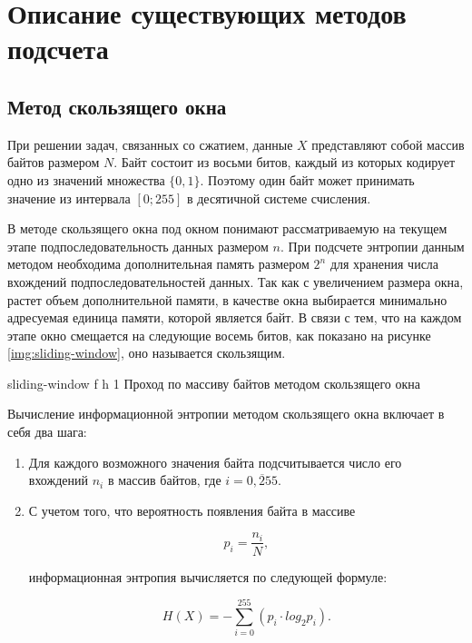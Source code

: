 \chapter{Описание существующих методов подсчета}

\section{Метод скользящего окна}

При решении задач, связанных со сжатием, данные $X$ представляют собой массив байтов размером $N$. Байт состоит из восьми битов, каждый из которых кодирует одно из значений множества $\{0, 1\}$. Поэтому один байт может принимать значение из интервала $[0; 255]$ в десятичной системе счисления. 

В методе скользящего окна \cite{sliding-window-method} под окном понимают рассматриваемую на текущем этапе подпоследовательность данных размером $n$. При подсчете энтропии данным методом необходима дополнительная память размером $2^n$ для хранения числа вхождений подпоследовательностей данных. Так как с увеличением размера окна, растет объем дополнительной памяти, в качестве окна выбирается минимально адресуемая единица памяти, которой является байт. В связи с тем, что на каждом этапе окно смещается на следующие восемь битов, как показано на рисунке \ref{img:sliding-window}, оно называется скользящим.

    {sliding-window}
    {f}
    {h}
    {1\textwidth}
    {Проход по массиву байтов методом скользящего окна}
    
Вычисление информационной энтропии методом скользящего окна включает в себя два шага:

\begin{enumerate}
	\item Для каждого возможного значения байта подсчитывается число его вхождений $n_{i}$ в массив байтов, где $i = \overline{0, 255}$.
	\item С учетом того, что вероятность появления байта в массиве
	
	\begin{equation}
		p_{i} = \frac{n_{i}}{N},
	\end{equation}
	
	информационная энтропия вычисляется по следующей формуле:
	
	\begin{equation}
		H(X) = -\sum_{i = 0}^{255} (p_{i} \cdot log_{2}p_{i}).
	\end{equation}
\end{enumerate}

